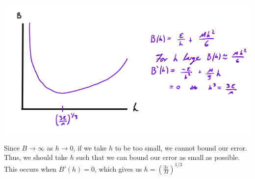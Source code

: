 \documentclass[10pt]{article}
\begin{document}
     \includegraphics[width=\linewidth]{Sketch.png}
     
     Since $B\to\infty$ as $h\to0$, if we take $h$ to be too small, we cannot bound our error. Thus, we should take $h$ such that we can bound our error as small as possible. This occurs when $B'(h)=0$, which gives us $h=\left(\frac{3\varepsilon}{M}\right)^{1/3}$
     
\end{document}
